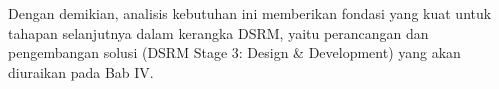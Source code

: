 Dengan demikian, analisis kebutuhan ini memberikan fondasi yang kuat untuk tahapan selanjutnya dalam kerangka DSRM, yaitu perancangan dan pengembangan solusi (DSRM Stage 3: Design \& Development) yang akan diuraikan pada Bab IV.

